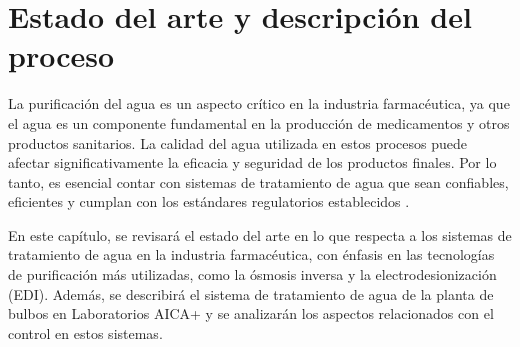 \chapter{Estado del arte y descripción del proceso}
La purificación del agua es un aspecto crítico en la industria farmacéutica, ya que el agua es un componente
fundamental en la producción de medicamentos y otros productos sanitarios. La calidad del agua utilizada
en estos procesos puede afectar significativamente la eficacia y seguridad de los productos finales.
Por lo tanto, es esencial contar con sistemas de tratamiento de agua que sean confiables, eficientes y cumplan con los estándares regulatorios establecidos \cite{juanantoniodelacuerdaImportanciaAguaIndustria2021}.

En este capítulo, se revisará el estado del arte en lo que respecta a los sistemas de tratamiento de
agua en la industria farmacéutica, con énfasis en las tecnologías de purificación más utilizadas, como la ósmosis inversa y la electrodesionización (EDI). Además,
se describirá el sistema de tratamiento de agua de la planta de bulbos en Laboratorios AICA+ y se analizarán los aspectos relacionados con el control en estos sistemas.


